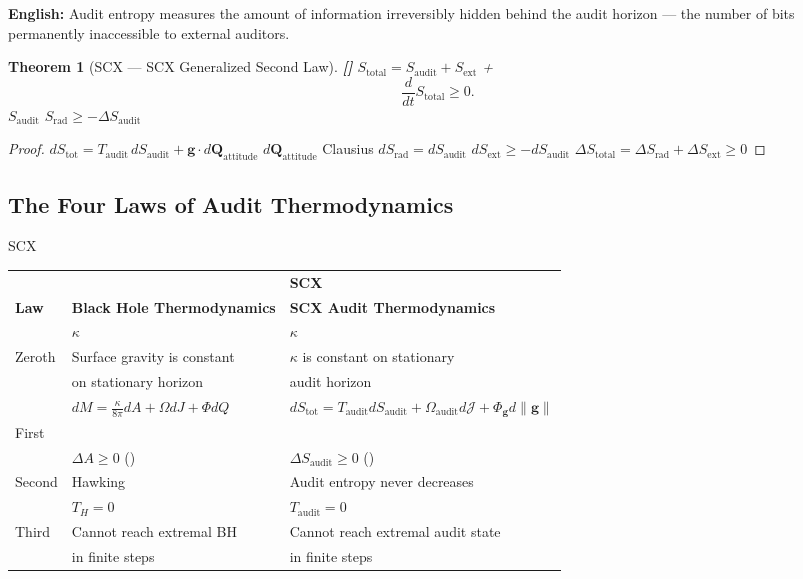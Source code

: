 \documentclass[12pt,a4paper]{article}
\newtheorem{theorem}{Theorem}[section]
\theoremstyle{remark}
\newcommand{\g}{\mathbf{g}}
\newcommand{\rigorFull}{\textnormal{\textbf{[]}}}
\newcommand{\cK}{\kappa}     %
\begin{document}
\vspace{4pt}
\noindent
\textbf{English:} Audit entropy measures the amount of information irreversibly hidden behind the audit horizon — the number of bits permanently inaccessible to external auditors.

\begin{theorem}[SCX — SCX Generalized Second Law]\label{thm:second_law}\rigorFull
 $S_{\mathrm{total}} = S_{\mathrm{audit}} + S_{\mathrm{ext}}$ + 
\begin{equation}
    \frac{d}{dt} S_{\mathrm{total}} \geq 0.
\end{equation}
$S_{\mathrm{audit}}$  $S_{\mathrm{rad}} \geq -\Delta S_{\mathrm{audit}}$ 
\end{theorem}

\begin{proof}
$d S_{\mathrm{tot}} = T_{\mathrm{audit}}\, dS_{\mathrm{audit}} + \g \cdot d\mathbf{Q}_{\mathrm{attitude}}$ $d\mathbf{Q}_{\mathrm{attitude}}$  Clausius $dS_{\mathrm{rad}} = dS_{\mathrm{audit}}$ $dS_{\mathrm{ext}} \geq -dS_{\mathrm{audit}}$ $\Delta S_{\mathrm{total}} = \Delta S_{\mathrm{rad}} + \Delta S_{\mathrm{ext}} \geq 0$
\end{proof}

\subsection{}
\subsection{The Four Laws of Audit Thermodynamics}

SCX

\vspace{6pt}
\begin{center}
\begin{tabular}{p{} p{} p{}}
\toprule
\textbf{} & \textbf{} & \textbf{SCX} \\
\textbf{Law} & \textbf{Black Hole Thermodynamics} & \textbf{SCX Audit Thermodynamics} \\
\midrule
 & $\kappa$  & $\cK$  \\
Zeroth & Surface gravity is constant & $\cK$ is constant on stationary \\
& on stationary horizon & audit horizon \\
\midrule
 & $dM = \frac{\kappa}{8\pi}dA + \Omega dJ + \Phi dQ$ & $dS_{\mathrm{tot}} = T_{\mathrm{audit}} dS_{\mathrm{audit}} + \Omega_{\mathrm{audit}} d\mathcal{J} + \Phi_{\g} d\|\g\|$ \\
First & & \\
\midrule
 & $\Delta A \geq 0$ () & $\Delta S_{\mathrm{audit}} \geq 0$ () \\
Second & Hawking & Audit entropy never decreases \\
\midrule
 &  $T_H=0$ &  $T_{\mathrm{audit}}=0$ \\
Third & Cannot reach extremal BH & Cannot reach extremal audit state \\
& in finite steps & in finite steps \\
\bottomrule
\end{tabular}
\end{center}
\end{document}
